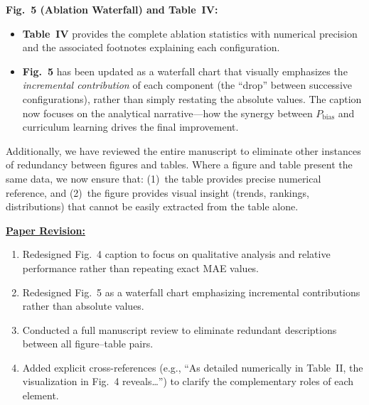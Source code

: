 \textbf{Fig.~5 (Ablation Waterfall) and Table~IV:}
\begin{itemize}
    \item \textbf{Table~IV} provides the complete ablation statistics with numerical precision and the associated footnotes explaining each configuration.
    \item \textbf{Fig.~5} has been updated as a waterfall chart that visually emphasizes the \emph{incremental contribution} of each component (the ``drop'' between successive configurations), rather than simply restating the absolute values. The caption now focuses on the analytical narrative---how the synergy between $P_{\text{bias}}$ and curriculum learning drives the final improvement.
\end{itemize}

Additionally, we have reviewed the entire manuscript to eliminate other instances of redundancy between figures and tables. Where a figure and table present the same data, we now ensure that: (1)~the table provides precise numerical reference, and (2)~the figure provides visual insight (trends, rankings, distributions) that cannot be easily extracted from the table alone.

\vspace{0.1cm}
\noindent
\underline{\textbf{Paper Revision:}}

\begin{enumerate}
    \item Redesigned Fig.~4 caption to focus on qualitative analysis and relative performance rather than repeating exact MAE values.
    \item Redesigned Fig.~5 as a waterfall chart emphasizing incremental contributions rather than absolute values.
    \item Conducted a full manuscript review to eliminate redundant descriptions between all figure--table pairs.
    \item Added explicit cross-references (e.g., ``As detailed numerically in Table~II, the visualization in Fig.~4 reveals\ldots'') to clarify the complementary roles of each element.
\end{enumerate}
